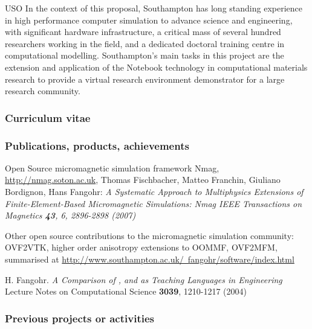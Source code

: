 \begin{sitedescription}{USO}
\medskip In the context of this proposal, Southampton has long
standing experience in high performance computer simulation to advance
science and engineering, with significant hardware infrastructure, a
critical mass of several hundred researchers working in the field, and
a dedicated doctoral training centre in computational modelling.
Southampton's main tasks in this project are the extension and application of the
\Jupyter{} Notebook technology in computational materials research to
provide a virtual research environment demonstrator for a large research community.

\subsubsection*{Curriculum vitae}





%

\subsubsection*{Publications, products, achievements}

\begin{compactenum}
\item Open Source micromagnetic simulation framework Nmag,
  \href{http://nmag.soton.ac.uk}{http://nmag.soton.ac.uk}, Thomas
  Fischbacher, Matteo Franchin, Giuliano Bordignon, Hans Fangohr: \emph{
A Systematic Approach to Multiphysics Extensions of Finite-Element-Based Micromagnetic Simulations: Nmag 
IEEE Transactions on Magnetics \textbf{43}, 6, 2896-2898 (2007)}
\item Other open source contributions to the micromagnetic simulation
  community: OVF2VTK, higher order anisotropy extensions to OOMMF,
  OVF2MFM, summarised at
  \href{http://www.southampton.ac.uk/~fangohr/software/index.html}{http://www.southampton.ac.uk/~fangohr/software/index.html} 
\item H. Fangohr.
\emph{A Comparison of , \Matlab and \Python as Teaching Languages in Engineering}
Lecture Notes on Computational Science \textbf{3039}, 1210-1217 (2004)
\end{compactenum}

\subsubsection*{Previous projects or activities}


\end{sitedescription}
